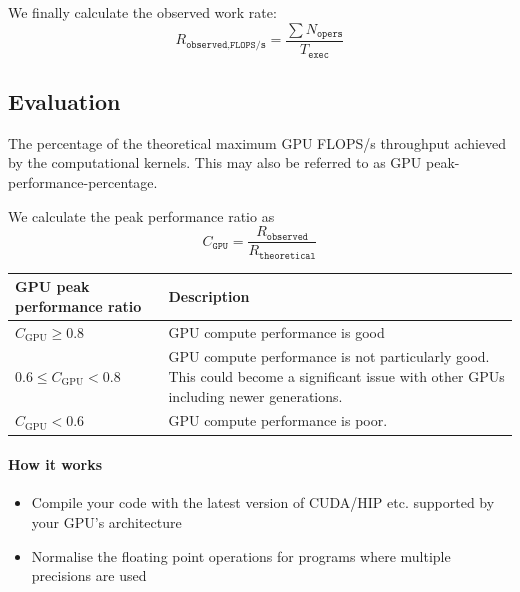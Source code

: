 We finally calculate the observed work rate:
\begin{equation}
    R_{\texttt{observed,FLOPS/s}} = \frac{\sum N_\texttt{opers}}{T_\texttt{exec}}
\end{equation}

\subsection{Evaluation}

\begin{performancemetric}
 The percentage of the theoretical maximum GPU FLOPS/s throughput achieved by the computational kernels. This may also be referred to as GPU peak-performance-percentage.
\end{performancemetric}

We calculate the peak performance ratio as
\begin{equation}
    C_\texttt{GPU} = \frac{R_\texttt{observed}}{R_\texttt{theoretical}}
\end{equation}

\begin{center}
 \begin{tabular}{p{}p{}}
  GPU peak performance ratio & Description \\
  \hline
  $C_{\text{GPU}} \geq 0.8$
   & \cellcolor{green!25} GPU compute performance is good
  \\
  $0.6 \leq C_{\text{GPU}} < 0.8$
   & \cellcolor{yellow!25} GPU compute performance is not particularly good. This could become a significant issue with other GPUs including newer generations.
  \\
  $C_{\text{GPU}} < 0.6$
   & \cellcolor{red!25} GPU compute performance is poor.
 \end{tabular}
\end{center}

\paragraph*{How it works}

\begin{itemize}[noitemsep]
  \item[$\boxplus$] Compile your code with the latest version of CUDA/HIP etc. supported by your GPU's architecture
  \item[$\boxplus$] Normalise the floating point operations for programs where multiple precisions are used
\end{itemize}


